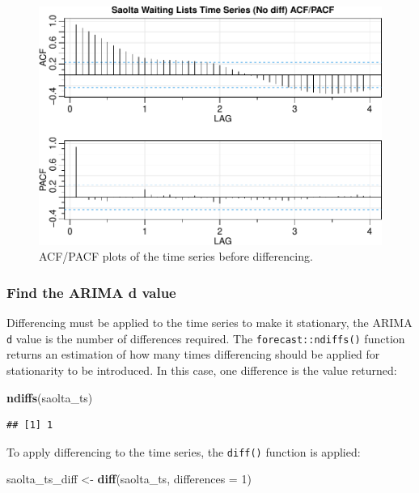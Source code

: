 \documentclass[
  12pt,
]{article}
\newenvironment{Shaded}{\begin{snugshade}}{\end{snugshade}}
\newcommand{\DataTypeTok}[1]{\textcolor[rgb]{0.13,0.29,0.53}{#1}}
\newcommand{\DecValTok}[1]{\textcolor[rgb]{0.00,0.00,0.81}{#1}}
\newcommand{\KeywordTok}[1]{\textcolor[rgb]{0.13,0.29,0.53}{\textbf{#1}}}
\newcommand{\NormalTok}[1]{#1}
\newcommand{\StringTok}[1]{\textcolor[rgb]{0.31,0.60,0.02}{#1}}
\begin{document}
\begin{figure}

{\centering \includegraphics[width=0.8\linewidth]{data_science_ca4_files/figure-latex/acf-nodiff-1} 

}

\caption{ACF/PACF plots of the time series before differencing.}\label{fig:acf-nodiff}
\end{figure}

\hypertarget{find-the-arima-d-value}{%
\subsubsection{Find the ARIMA d value}\label{find-the-arima-d-value}}

Differencing must be applied to the time series to make it stationary, the ARIMA \texttt{d} value is the number of differences required. The \texttt{forecast::ndiffs()} function returns an estimation of how many times differencing should be applied for stationarity to be introduced. In this case, one difference is the value returned:
\small

\begin{Shaded}
\begin{Highlighting}[]
\KeywordTok{ndiffs}\NormalTok{(saolta\_ts)}
\end{Highlighting}
\end{Shaded}

\begin{verbatim}
## [1] 1
\end{verbatim}

\normalsize

To apply differencing to the time series, the \texttt{diff()} function is applied:
\small

\begin{Shaded}
\begin{Highlighting}[]
\NormalTok{saolta\_ts\_diff \textless{}{-}}\StringTok{ }\KeywordTok{diff}\NormalTok{(saolta\_ts, }\DataTypeTok{differences =} \DecValTok{1}\NormalTok{)}
\end{Highlighting}
\end{Shaded}
\end{document}
